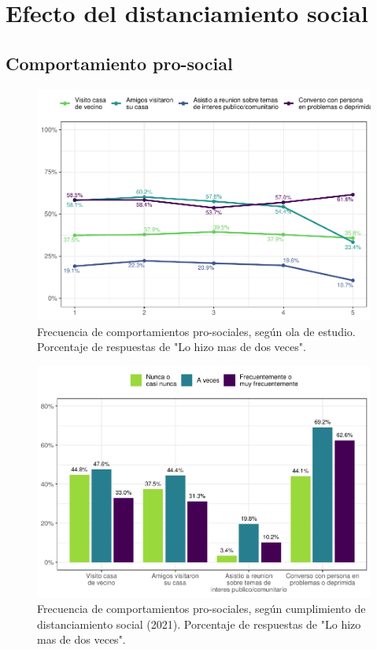 \documentclass[
  12pt,
  openany]{book}
\begin{document}
\hypertarget{efecto-del-distanciamiento-social}{%
\section{Efecto del distanciamiento social}\label{efecto-del-distanciamiento-social}}

\hypertarget{comportamiento-pro-social}{%
\subsection{Comportamiento pro-social}\label{comportamiento-pro-social}}

\begin{figure}

{\centering \includegraphics{reporte-elsoc_files/figure-latex/dist-pros-1} 

}

\caption{Frecuencia de comportamientos pro-sociales, según ola de estudio. Porcentaje de respuestas de "Lo hizo mas de dos veces".}\label{fig:dist-pros}
\end{figure}
\begin{figure}

{\centering \includegraphics{reporte-elsoc_files/figure-latex/dist-pros2-1} 

}

\caption{Frecuencia de comportamientos pro-sociales, según cumplimiento de distanciamiento social (2021). Porcentaje de respuestas de "Lo hizo mas de dos veces".}\label{fig:dist-pros2}
\end{figure}
\end{document}
